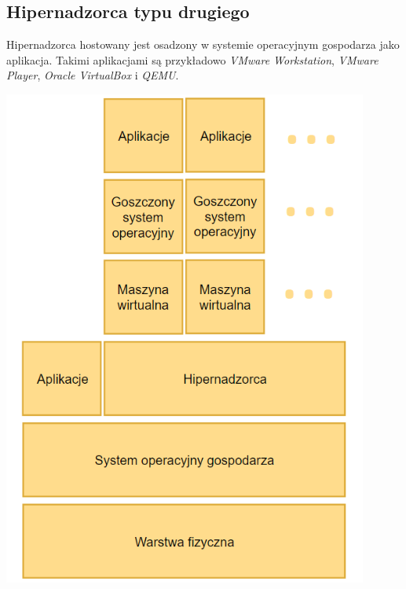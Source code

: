 \documentclass[polish, a4paper, 12pt, oneside]{book}
\begin{document}
\subsection {Hipernadzorca typu drugiego} 
Hipernadzorca hostowany jest osadzony w systemie operacyjnym gospodarza jako aplikacja. Takimi aplikacjami są przykładowo \textit{VMware Workstation}\cite{vmwareworkstation}, \textit{VMware Player}\cite{vmwareplayer}, \textit{Oracle VirtualBox}\cite{virtualbox} i \textit{QEMU}\cite{qemu}.
\begin{center}
\includegraphics[width=120mm]{schemat_hiper2.png}
\end{center}
\end{document}
